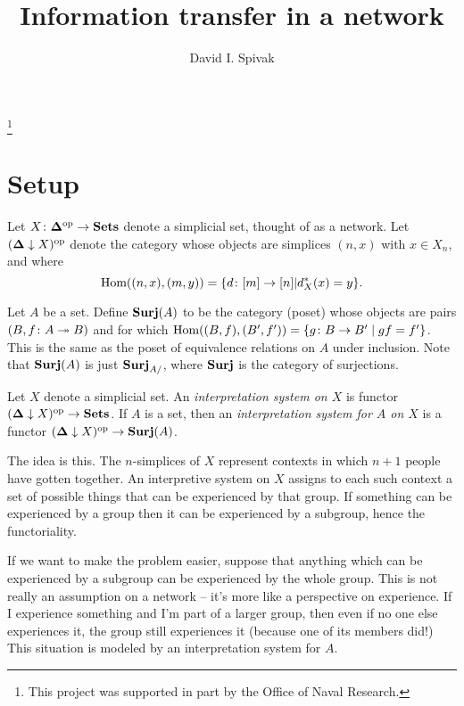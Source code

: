 \documentclass{amsart}
\def\bD{{\bf \Delta}}
\def\down{\downarrow}
\def\Surj{{\bf Surj}}
\begin{document}
\title{Information transfer in a network}

\author{David I. Spivak}

\thanks{This project was supported in part by the Office of Naval Research.}

\maketitle

\tableofcontents

\section{Setup}

Let $X\taking\bD\op\to\Sets$ denote a simplicial set, thought of as a network.  Let $(\bD\down X)\op$ denote the category whose objects are simplices $(n,x)$ with $x\in X_n$, and where $$\textnormal{Hom}((n,x),(m,y))=\{d\colon [m]\rightarrow[n]| d^*_X(x)=y\}.$$

Let $A$ be a set.  Define $\Surj(A)$ to be the category (poset) whose objects are pairs $(B,f\colon A\twoheadrightarrow B)$ and for which $\textnormal{Hom}((B,f),(B',f'))=\{g\colon B\rightarrow B'\;|\;gf=f'\}$.  This is the same as the poset of equivalence relations on $A$ under inclusion.  Note that $\Surj(A)$ is just $\Surj_{A/}$, where $\Surj$ is the category of surjections.

\begin{definition}

Let $X$ denote a simplicial set.  An {\em interpretation system on $X$} is functor $(\bD\down X)\op\to\Sets$.  If $A$ is a set, then an {\em interpretation system for $A$ on $X$} is a functor $(\bD\down X)\op\to\Surj(A)$.

\end{definition}

The idea is this.  The $n$-simplices of $X$ represent contexts in which $n+1$ people have gotten together.  An interpretive system on $X$ assigns to each such context a set of possible things that can be experienced by that group.  If something can be experienced by a group then it can be experienced by a subgroup, hence the functoriality. 

If we want to make the problem easier, suppose that anything which can be experienced by a subgroup can be experienced by the whole group.  This is not really an assumption on a network -- it's more like a perspective on experience.  If I experience something and I'm part of a larger group, then even if no one else experiences it, the group still experiences it (because one of its members did!)  This situation is modeled by an interpretation system for $A$.
\end{document}
